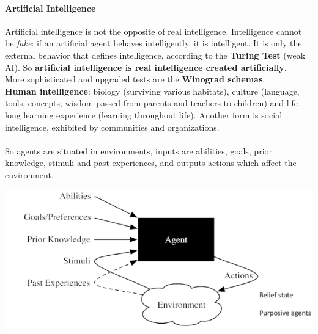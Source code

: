 \documentclass[10pt]{report}
\begin{document}
\paragraph{Artificial Intelligence} Artificial intelligence is not the opposite of real intelligence. Intelligence cannot be \textit{fake}: if an artificial agent behaves intelligently, it is intelligent. It is only the external behavior that defines intelligence, according to the \textbf{Turing Test} (weak AI). So \textbf{artificial intelligence is real intelligence created artificially}.\\
More sophisticated and upgraded tests are the \textbf{Winograd schemas}.\\
\textbf{Human intelligence}: biology (surviving various habitats), culture (language, tools, concepts, wisdom passed from parents and teachers to children) and life-long learning experience (learning throughout life). Another form is social intelligence, exhibited by communities and organizations.\\\\
So agents are situated in environments, inputs are abilities, goals, prior knowledge, stimuli and past experiences, and outputs actions which affect the environment.
\begin{center}
	\includegraphics[scale=0.5]{1.png}
\end{center}
\end{document}
